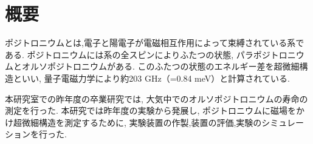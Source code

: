 \chapter{概要}\label{abstract}

ポジトロニウムとは,電子と陽電子が電磁相互作用によって束縛されている系である.
ポジトロニウムには系の全スピンによりふたつの状態,
パラポジトロニウムとオルソポジトロニウムがある.
このふたつの状態のエネルギー差を超微細構造といい,
量子電磁力学により約203 GHz（=0.84 meV）と計算されている.

本研究室での昨年度の卒業研究では,
大気中でのオルソポジトロニウムの寿命の測定を行った.
本研究では昨年度の実験から発展し,
ポジトロニウムに磁場をかけ超微細構造を測定するために,
実験装置の作製,装置の評価,実験のシミュレーションを行った.

